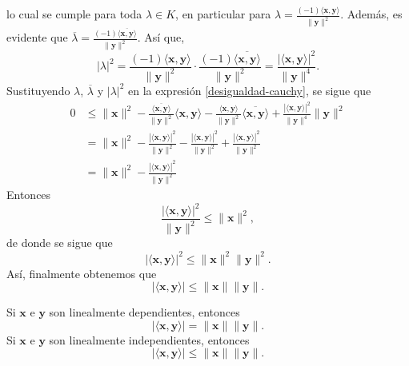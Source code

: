 \begin{theorem}{}{}
    lo cual se cumple para toda $\lambda \in K$, en particular para $\displaystyle \lambda = \frac{(-1)\langle \mathbf{x}, \mathbf{y} \rangle}{\| \mathbf{y} \|^2}$. Además, es evidente que $\displaystyle \overline{\lambda} = \frac{(-1)\overline{\langle \mathbf{x}, \mathbf{y} \rangle}}{\| \mathbf{y} \|^2}$. Así que,
    $$|\lambda|^2 = \frac{(-1)\langle \mathbf{x}, \mathbf{y} \rangle}{\| \mathbf{y} \|^2} \cdot \frac{(-1)\overline{\langle \mathbf{x}, \mathbf{y} \rangle}}{\| \mathbf{y} \|^2} = \frac{|\langle \mathbf{x}, \mathbf{y} \rangle|^2}{\| \mathbf{y} \|^4}.$$
    Sustituyendo $\lambda$, $\overline{\lambda}$ y $|\lambda|^2$ en la expresión \eqref{desigualdad-cauchy}, se sigue que
    \begin{align*}
        0 & \leq \| \mathbf{x} \|^2 - \frac{\overline{\langle \mathbf{x}, \mathbf{y} \rangle}}{\| \mathbf{y} \|^2} \langle \mathbf{x}, \mathbf{y} \rangle - \frac{\langle \mathbf{x}, \mathbf{y} \rangle}{\| \mathbf{y} \|^2} \overline{\langle \mathbf{x}, \mathbf{y} \rangle} + \frac{|\langle \mathbf{x}, \mathbf{y} \rangle|^2}{\| \mathbf{y} \|^4} \| \mathbf{y} \|^2 \\
        & = \| \mathbf{x} \|^2 - \frac{|\langle \mathbf{x}, \mathbf{y} \rangle|^2}{\| \mathbf{y} \|^2} - \frac{|\langle \mathbf{x}, \mathbf{y} \rangle|^2}{\| \mathbf{y} \|^2} + \frac{|\langle \mathbf{x}, \mathbf{y} \rangle|^2}{\| \mathbf{y} \|^2} \\
        & = \| \mathbf{x} \|^2 - \frac{|\langle \mathbf{x}, \mathbf{y} \rangle|^2}{\| \mathbf{y} \|^2}
    \end{align*}
    Entonces
    $$\frac{|\langle \mathbf{x}, \mathbf{y} \rangle|^2}{\| \mathbf{y} \|^2} \leq \| \mathbf{x} \|^2,$$
    de donde se sigue que
    $$|\langle \mathbf{x}, \mathbf{y} \rangle|^2 \leq \| \mathbf{x} \|^2 \| \mathbf{y} \|^2.$$
    Así, finalmente obtenemos que
    $$|\langle \mathbf{x}, \mathbf{y} \rangle| \leq \| \mathbf{x} \| \| \mathbf{y} \|.$$
\end{theorem}

\begin{corollary}{}{}
    Si $\mathbf{x}$ e $\mathbf{y}$ son linealmente dependientes, entonces
    $$|\langle \mathbf{x}, \mathbf{y} \rangle| = \| \mathbf{x} \| \| \mathbf{y} \|.$$
    Si $\mathbf{x}$ e $\mathbf{y}$ son linealmente independientes, entonces
    $$|\langle \mathbf{x}, \mathbf{y} \rangle| \leq \| \mathbf{x} \| \| \mathbf{y} \|.$$
\end{corollary}